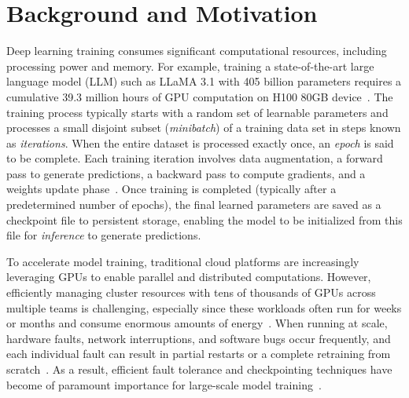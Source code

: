 
\section{Background and Motivation}\label{sec:background}%

Deep learning training consumes significant computational resources, including processing power and memory. For example, training a state-of-the-art large language model (LLM) such as LLaMA 3.1 with 405 billion parameters requires a cumulative 39.3 million hours of GPU computation on H100 80GB device~\cite{dubey2024llama}. The training process typically starts with a random set of learnable parameters and processes a small disjoint subset (\textit{minibatch}) of a training data set in steps known as \textit{iterations}. When the entire dataset is processed exactly once, an \textit{epoch} is said to be complete. Each training iteration involves data augmentation, a forward pass to generate predictions, a backward pass to compute gradients, and a weights update phase~\cite{goodfellow2016deep}. Once training is completed (typically after a predetermined number of epochs), the final learned parameters are saved as a checkpoint file to persistent storage, enabling the model to be initialized from this file for \textit{inference} to generate predictions.

To accelerate model training, traditional cloud platforms are increasingly leveraging GPUs to enable parallel and distributed computations. However, efficiently managing cluster resources with tens of thousands of GPUs across multiple teams is challenging, especially since these workloads often run for weeks or months and consume enormous amounts of energy~\cite{yang2024part, dubey2024llama}. When running at scale, hardware faults, network interruptions, and software bugs occur frequently, and each individual fault can result in partial restarts or a complete retraining from scratch~\cite{rojas2019analyzing}. As a result, efficient fault tolerance and checkpointing techniques have become of paramount importance for large-scale model training~\cite{mohan2021checkfreq,wang2023gemini,gupta2024just}.

